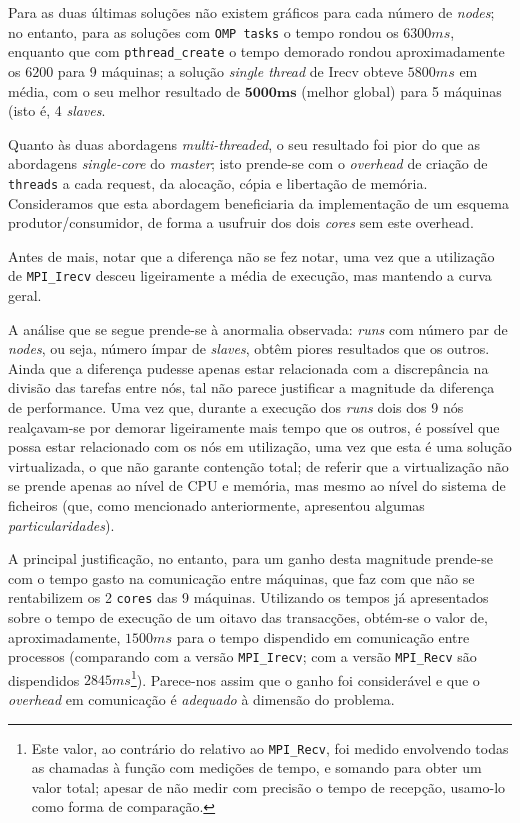 \documentclass[a4paper]{article}
\begin{document}
\indent \indent Para as duas últimas soluções não existem gráficos para cada número de \textit{nodes}; no entanto, para as soluções com \texttt{OMP tasks} o tempo rondou os $6300ms$, enquanto que com \texttt{pthread\_create} o tempo demorado rondou aproximadamente os $6200$ para 9 máquinas; a solução \textit{single thread} de Irecv obteve $5800ms$ em média, com o seu melhor resultado de $\mathbf{5000ms}$ (melhor global) para 5 máquinas (isto é, 4 \textit{slaves}.

Quanto às duas abordagens \textit{multi-threaded}, o seu resultado foi pior do que as abordagens \textit{single-core} do \textit{master}; isto prende-se com o \textit{overhead} de criação de \texttt{threads} a cada request, da alocação, cópia e libertação de memória. Consideramos que esta abordagem beneficiaria da implementação de um esquema produtor/consumidor, de forma a usufruir dos dois \textit{cores} sem este overhead.

Antes de mais, notar que a diferença não se fez notar, uma vez que a utilização de \texttt{MPI\_Irecv} desceu ligeiramente a média de execução, mas mantendo a curva geral.

A análise que se segue prende-se à anormalia observada: \textit{runs} com número par de \textit{nodes}, ou seja, número ímpar de \textit{slaves}, obtêm piores resultados que os outros. Ainda que a diferença pudesse apenas estar relacionada com a discrepância na divisão das tarefas entre nós, tal não parece justificar a magnitude da diferença de performance. Uma vez que, durante a execução dos \textit{runs} dois dos 9 nós realçavam-se por demorar ligeiramente mais tempo que os outros, é possível que possa estar relacionado com os nós em utilização, uma vez que esta é uma solução virtualizada, o que não garante contenção total; de referir que a virtualização não se prende apenas ao nível de CPU e memória, mas mesmo ao nível do sistema de ficheiros (que, como mencionado anteriormente, apresentou algumas \textit{particularidades}).

A principal justificação, no entanto, para um ganho desta magnitude prende-se com o tempo gasto na comunicação entre máquinas, que faz com que não se rentabilizem os 2 \texttt{cores} das 9 máquinas. Utilizando os tempos já apresentados sobre o tempo de execução de um oitavo das transacções, obtém-se o valor de, aproximadamente, $1500ms$ para o tempo dispendido em comunicação entre processos (comparando com a versão \texttt{MPI\_Irecv}; com a versão \texttt{MPI\_Recv} são dispendidos $2845ms$\footnote{Este valor, ao contrário do relativo ao \texttt{MPI\_Recv}, foi medido envolvendo todas as chamadas à função com medições de tempo, e somando para obter um valor total; apesar de não medir com precisão o tempo de recepção, usamo-lo como forma de comparação.}). Parece-nos assim que o ganho foi considerável e que o \textit{overhead} em comunicação é \textit{adequado} à dimensão do problema.
\end{document}
